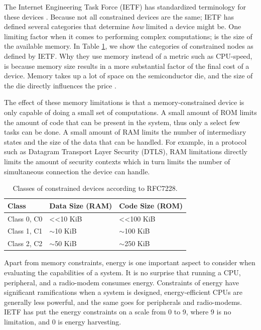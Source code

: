 The Internet Engineering Task Force (IETF) has standardized terminology for these devices \cite{rfc7228}. Because not all constrained devices are the same; IETF has defined several categories that determine \emph{how} limited a device might be. One limiting factor when it comes to performing complex computations; is the size of the available memory. In Table \ref{tab:constrained-classes}, we show the categories of constrained nodes as defined by IETF. Why they use memory instead of a metric such as CPU-speed, is because memory size results in a more substantial factor of the final cost of a device. Memory takes up a lot of space on the semiconductor die, and the size of the die directly influences the price \cite{koopman2015}.


The effect of these memory limitations is that a memory-constrained device is only capable of doing a small set of computations. A small amount of ROM limits the amount of code that can be present in the system, thus only a select few tasks can be done. A small amount of RAM limits the number of intermediary states and the size of the data that can be handled. For example, in a protocol such as Datagram Transport Layer Security (DTLS), RAM limitations directly limits the amount of security contexts which in turn limits the number of simultaneous connection the device can handle.

\begin{table}[h]
\centering
\caption{Classes of constrained devices according to RFC7228.}
\label{tab:constrained-classes}
\begin{tabular}{lll}
\hline\hline
\textbf{Class}  & \textbf{Data Size (RAM)}  & \textbf{Code Size (ROM)}    \\ \hline
Class 0, C0 & \textless{}\textless 10 KiB & \textless{}\textless  100 KiB \\ 
Class 1, C1 & $\sim$10 KiB                & $\sim$100 KiB                 \\ 
Class 2, C2 & $\sim$50 KiB                & $\sim$250 KiB                 \\ \hline\hline
\end{tabular}
\end{table}


Apart from memory constraints, energy is one important aspect to consider when evaluating the capabilities of a system. It is no surprise that running a CPU, peripheral, and a radio-modem consumes energy. Constraints of energy have significant ramifications when a system is designed, energy-efficient CPUs are generally less powerful, and the same goes for peripherals and radio-modems. IETF has put the energy constraints on a scale from 0 to 9, where 9 is no limitation, and 0 is energy harvesting. 

